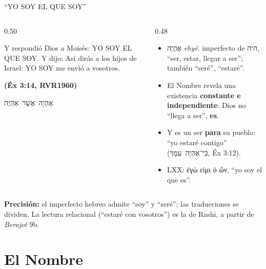 \documentclass[hyperref={bookmarks=false},aspectratio=169]{beamer}
\newcommand{\heb}[1]{\mbox{\foreignlanguage{hebrew}{#1}}}
\newcommand{\grc}[1]{\foreignlanguage{ancientgreek}{#1}}
\newcommand{\fuente}[1]{\par\hfill{\upshape\bfseries\footnotesize\textcolor{azul}{#1}}}
\newcommand{\destacar}[1]{\textbf{\textcolor{azul}{#1}}}
\newcommand{\precision}[1]{{\footnotesize\color{gris}\textbf{Precisión:} #1}}
\begin{document}
\begin{frame}{``YO SOY EL QUE SOY''}
\begin{columns}[c,onlytextwidth]
\begin{column}{0.50\textwidth}
\begin{cita}Y respondió Dios a Moisés: YO SOY EL QUE SOY. Y dijo: Así dirás a los hijos de Israel: YO SOY me envió a vosotros.\fuente{(Éx 3:14, RVR1960)}\end{cita}
\begin{center}\Large\heb{אֶהְיֶה אֲשֶׁר אֶהְיֶה}\end{center}
\end{column}
\begin{column}{0.48\textwidth}\small
\begin{itemize}
\item \heb{אֶהְיֶה} \emph{ehyé}: imperfecto de \heb{היה}, ``ser, estar, llegar a ser''; también ``seré'', ``estaré''.
\item El Nombre revela una existencia \destacar{constante e independiente}: Dios no ``llega a ser'', \destacar{es}.
\item Y es un ser \destacar{para} su pueblo: ``yo estaré contigo'' (\heb{כִּי־אֶהְיֶה עִמָּךְ}, Éx 3:12).
\item LXX: \grc{ἐγώ εἰμι ὁ ὤν}, ``yo soy el que es''.
\end{itemize}
\end{column}
\end{columns}\par\smallskip
\precision{el imperfecto hebreo admite ``soy'' y ``seré''; las traducciones se dividen. La lectura relacional (``estaré con vosotros'') es la de Rashi, a partir de \emph{Berajot} 9b.}
\end{frame}

\section{El Nombre}
\end{document}
